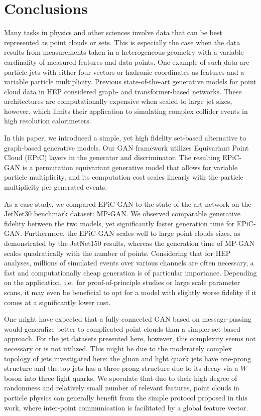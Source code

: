 \documentclass[a4paper,submission, Phys]{SciPost}
\begin{document}
\section{Conclusions}
\label{sec:conclusions}


Many tasks in physics and other sciences involve data that can be best represented as point clouds or sets.
%
This is especially the case when the data results from measurements taken in a heterogeneous geometry with a variable cardinality of measured features and data points.
%
One example of such data are particle jets with either four-vectors or hadronic coordinates as features and a variable particle multiplicity. 
%
Previous state-of-the-art generative models for point cloud data in HEP considered graph- and transformer-based networks.
%
These architectures are computationally expensive when scaled to large jet sizes, however, which limits their application to simulating complex collider events in high resolution calorimeters.


In this paper, we introduced a simple, yet high fidelity set-based alternative to graph-based generative models. 
%
Our GAN framework utilizes Equivariant Point Cloud (EPiC) layers in the generator and discriminator. 
%
The resulting EPiC-GAN is a permutation equivariant generative model that allows for variable particle multiplicity, and its computation cost scales linearly with the particle multiplicity per generated events. 


As a case study, we compared EPiC-GAN to the state-of-the-art network on the JetNet30 benchmark dataset: MP-GAN.
%
We observed comparable generative fidelity between the two models, yet significantly faster generation time for EPiC-GAN. 
%
Furthermore, the EPiC-GAN scales well to large point clouds sizes, as demonstrated by the JetNet150 results, whereas the generation time of MP-GAN scales quadratically with the number of points. 
%
Considering that for HEP analyses, millions of simulated events over various channels are often necessary, a fast and computationally cheap generation is of particular importance.
%
Depending on the application, i.e.\ for proof-of-principle studies or large scale parameter scans, it may even be beneficial to opt for a model with slightly worse fidelity if it comes at a significantly lower cost.


One might have expected that a fully-connected GAN based on message-passing would generalize better to complicated point clouds than a simpler set-based approach.
%
For the jet datasets presented here, however, this complexity seems not necessary or is not utilized. 
%
This might be due to the moderately complex topology of jets investigated here: the gluon and light quark jets have one-prong structure and the top jets has a three-prong structure due to its decay via a $W$ boson into three light quarks.
%
We speculate that due to their high degree of randomness and relatively small number of relevant features, point clouds in particle physics can generally benefit from the simple protocol proposed in this work, where inter-point communication is facilitated by a global feature vector.
\end{document}
